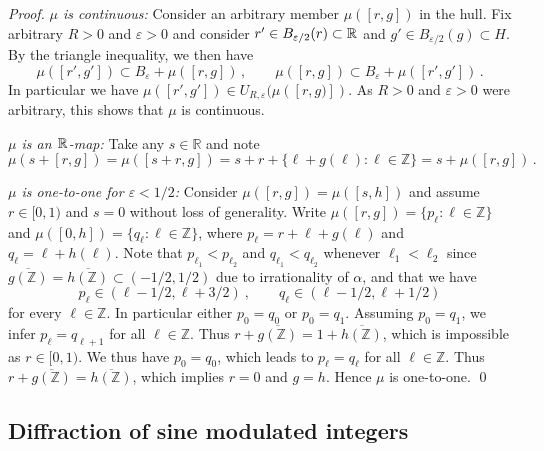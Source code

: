 \documentclass[11pt, a4wide]{amsart}
\newcommand{\ts}{\hspace{0.5pt}}
\newcommand{\RR}{\mathbb{R}\ts}
\newcommand{\ZZ}{\mathbb{Z}}
\numberwithin{lemma}{section}
\begin{document}
\begin{proof}
\smallskip

\smallskip

\noindent \textit{$\mu$ is continuous:}  Consider an arbitrary member $\mu([r,g])$ in the hull. Fix arbitrary $R>0$ and $\varepsilon>0$ and consider $r'\in B_{\varepsilon/2}(r)\subset \RR$ and $g'\in B_{\varepsilon/2}(g)\subset H$. By the triangle inequality, we then have
%
\begin{displaymath}
\mu([r',g'])\subset B_\varepsilon+\mu([r,g])\,, \qquad \mu([r,g])\subset B_\varepsilon+\mu([r',g'])\,.
\end{displaymath}
%
In particular we have $\mu([r',g'])\in U_{R, \varepsilon}(\mu([r, g)])$. As $R>0$ and $\varepsilon>0$ were arbitrary, this shows that $\mu$ is continuous.


\smallskip



\noindent \textit{$\mu$ is an $\RR$-map:} Take any $s\in\mathbb R$ and note
%
\[
\mu(s + [r, g]) = \mu([s + r, g]) = s + r + \{\ell + g(\ell): \ell \in \ZZ \}= s+ \mu([r, g])\,.
\]
%
\smallskip

\noindent \textit{$\mu$ is one-to-one for $\varepsilon<1/2$:}
Consider $\mu([r,g])=\mu([s,h])$ and assume $r\in [0,1)$ and $s=0$  without loss of generality.  Write $\mu([r,g])=\{p_\ell:\ell\in\ZZ\}$ and  $\mu([0,h])=\{q_\ell:\ell\in\ZZ\}$, where  $p_\ell=r+\ell+g(\ell)$ and $q_\ell=\ell+h(\ell)$. Note that $p_{\ell_1}<p_{\ell_2}$ and  $q_{\ell_1}<q_{\ell_2}$ whenever $\ell_1<\ell_2$ since  $\overline{g(\ZZ)} = \overline{h(\ZZ)}\subset (-1/2,1/2)$ due to irrationality of $\alpha$, and that we have
%
\begin{displaymath}
p_\ell \in (\ell-1/2, \ell+3/2) \ , \qquad q_\ell \in (\ell-1/2, \ell+1/2)
\end{displaymath}
%
for every $\ell\in \ZZ$. In particular either $p_0=q_0$ or $p_0=q_1$.
Assuming $p_0=q_1$, we infer $p_\ell=q_{\ell+1}$ for all $\ell\in \ZZ$. Thus $r+\overline{g(\ZZ)}=1+\overline{h(\ZZ)}$, which is impossible as $r\in [0,1)$.
We thus have $p_0=q_0$, which leads to $p_\ell=q_\ell$ for all $\ell\in \ZZ$. Thus $r+\overline{g(\ZZ)}=\overline{h(\ZZ)}$, which implies $r=0$ and $g=h$. Hence $\mu$ is one-to-one. \qed
\end{proof}



\subsection{Diffraction of sine modulated integers}\label{sec:diffsmi}
\end{document}
